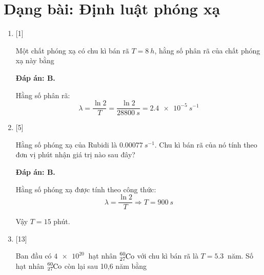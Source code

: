 \section{Dạng bài: Định luật phóng xạ}
\begin{enumerate}[label=\bfseries Câu \arabic*:]
		\item {} [1]
	
	\cauhoi
	{Một chất phóng xạ có chu kì bán rã $T=\SI{8}{h}$, hằng số phân rã của chất phóng xạ này bằng
	}
	
	\loigiai
	{		\textbf{Đáp án: B.}
		
		Hằng số phân rã:
		$$\lambda = \dfrac{\ln 2}{T} = \dfrac{\ln 2}{\SI{28800}{s}} = \SI{2.4e-5}{s^{-1}}$$
		
	}
	\item {} [5]
	
	\cauhoi
	{Hằng số phóng xạ của Rubidi là $\SI{0.00077}{s^{-1}}$. Chu kì bán rã của nó tính theo đơn vị phút nhận giá trị nào sau đây?
	}
	
	\loigiai
	{		\textbf{Đáp án: B.}
		
		Hằng số phóng xạ được tính theo công thức:
		$$\lambda = \dfrac{\ln 2}{T} \Rightarrow T = \SI{900}{s}$$
		
		Vậy $T=15$ phút.
		
	}

		\item {}
	
	\cauhoi
	{Ban đầu có $\SI{4e20}{}$ hạt nhân $\ce{^60_27 Co}$ với chu kì bán rã là $T=\SI{5.3}{}$ năm. Số hạt nhân $\ce{^60_27 Co}$ còn lại sau 10,6 năm bằng
	}
	

\end{enumerate}
